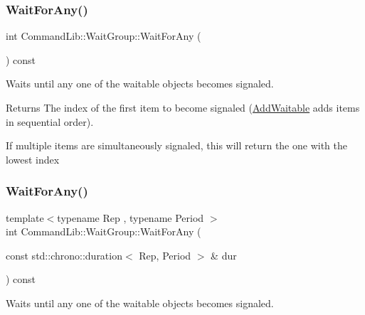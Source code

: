 \subsubsection{\texorpdfstring{Wait\+For\+Any()}{WaitForAny()}\hspace{0.1cm}{\footnotesize\ttfamily [1/3]}}
{\footnotesize\ttfamily int Command\+Lib\+::\+Wait\+Group\+::\+Wait\+For\+Any (\begin{DoxyParamCaption}{ }\end{DoxyParamCaption}) const}



Waits until any one of the waitable objects becomes signaled.

\begin{DoxyReturn}{Returns}
The index of the first item to become signaled (\mbox{\hyperlink{class_command_lib_1_1_wait_group_a2ad37bdf4b472ad67c660ceb2a9ca0c9}{Add\+Waitable}} adds items in sequential order). 
\end{DoxyReturn}


If multiple items are simultaneously signaled, this will return the one with the lowest index \mbox{\label{class_command_lib_1_1_wait_group_a607e5738e2ef6d34c70459954a752340}} 
\subsubsection{\texorpdfstring{Wait\+For\+Any()}{WaitForAny()}\hspace{0.1cm}{\footnotesize\ttfamily [2/3]}}
{\footnotesize\ttfamily template$<$typename Rep , typename Period $>$ \\
int Command\+Lib\+::\+Wait\+Group\+::\+Wait\+For\+Any (\begin{DoxyParamCaption}\item[{const std\+::chrono\+::duration$<$ Rep, Period $>$ \&}]{dur }\end{DoxyParamCaption}) const\hspace{0.3cm}{\ttfamily [inline]}}



Waits until any one of the waitable objects becomes signaled.


